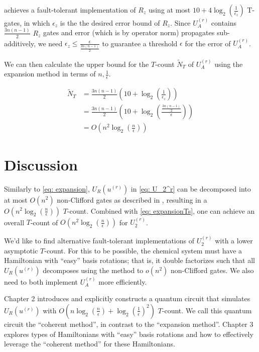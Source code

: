 \cite{Rz} achieves a fault-tolerant implementation of $R_z$ using at most $10 + 4\log_2(\frac{1}{\epsilon_z})$ T-gates, in which $\epsilon_z$ is the the desired error bound of $R_z$. Since $U_A^{(r)}$ contains $\frac{3n(n - 1)}{2}$ $R_z$ gates and error (which is by operator norm) propagates sub-additively, we need $\epsilon_z \leq \frac{\epsilon}{\frac{3n(n - 1)}{2}}$ to guarantee a threshold $\epsilon$ for the error of $U_A^{(r)}$.

We can then calculate the upper bound for the $T$-count $\tilde{N}_T$ of $U_A^{(r)}$ using the expansion method in terms of $n, \frac{1}{\epsilon}$.

\begin{equation}
    \begin{split}
        \tilde{N}_T &= \frac{3n(n - 1)}{2}(10 + \log_2(\frac{1}{\epsilon_z})) \\
        &= \frac{3n(n - 1)}{2}(10 + \log_2(\frac{\frac{3n(n - 1)}{2}}{\epsilon})) \\
        &= O(n^2\log_2(\frac{n}{\epsilon}))
    \end{split}
    \label{eq: expansionTs}
\end{equation}

\section{Discussion}

Similarly to \eqref{eq: expansion}, $U_R(u^{(r)})$ in \eqref{eq: U_2^r} can be decomposed into at most $O(n^2)$ non-Clifford gates as described in \cite{FSN}, resulting in a $O(n^2\log_2(\frac{n}{\epsilon}))$ $T$-count. Combined with \eqref{eq: expansionTs}, one can achieve an overall $T$-count of $O(n^2\log_2(\frac{n}{\epsilon}))$ for $U_2^{(r)}$.

We'd like to find alternative fault-tolerant implementations of $U_2^{(r)}$ with a lower asymptotic $T$-count. For this to be possible, the chemical system must have a Hamiltonian with ``easy'' basis rotations; that is, it double factorizes such that all $U_R(u^{(r)})$ decomposes using the \cite{FSN} method to $o(n^2)$ non-Clifford gates. We also need to both implement $U_A^{(r)}$ more efficiently.

Chapter 2 introduces and explicitly constructs a quantum circuit that simulates $U_R(u^{(r)})$ with $O(n\log_2(\frac{n}{\epsilon}) + \log_2(\frac{1}{\epsilon})^2)$ $T$-count. We call this quantum circuit the ``coherent method'', in contrast to the ``expansion method''. Chapter 3 explores types of Hamiltonians with ``easy'' basis rotations and how to effectively leverage the ``coherent method'' for these Hamiltonians.


